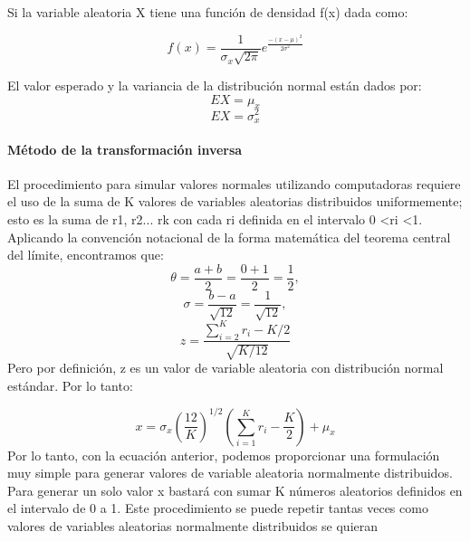 \documentclass{article}
\begin{document}
  Si la variable aleatoria X tiene una función de densidad f(x) dada como:

  \begin{equation}
    f(x) = \frac{1}{σ_{x}\sqrt {2\pi}}e^{\frac{-(x-\mu)^2}{2σ^2}}
  \end{equation}

  El valor esperado y la variancia de la distribución normal están dados por:
  \begin{equation}
    EX = \mu_{x}
  \end{equation}
  \begin{equation}
    EX = \sigma_{x}^2
  \end{equation}

  \paragraph{Método de la transformación inversa\newline}
  El procedimiento para simular valores normales utilizando computadoras requiere el uso de la suma de K valores de
  variables aleatorias distribuidos uniformemente; esto es la suma de r1, r2... rk con cada ri definida en el intervalo 0 <ri
  <1. Aplicando la convención notacional de la forma matemática del teorema central del límite, encontramos que:
  \begin{equation}
    \theta = \frac{a+b}{2} = \frac{0+1}{2} = \frac{1}{2},
  \end{equation}
  \begin{equation}
    \sigma = \frac{b-a}{\sqrt {12}} = \frac{1}{\sqrt {12}},
  \end{equation}
  \begin{equation}
    z = \frac{\sum_{i=2}^{K}r_{i}-K/2}{\sqrt {K/12}}
  \end{equation}
  Pero por definición, z es un valor de variable aleatoria con distribución normal estándar.
  Por lo tanto:

  \begin{equation}
    x = \sigma_{x}(\frac{12}{K})^{1/2}(\sum_{i=1}^{K}r_{i}-\frac{K}{2}) + \mu_{x}
  \end{equation}
  Por lo tanto, con la ecuación anterior, podemos proporcionar una formulación muy simple para generar valores de
  variable aleatoria normalmente distribuidos. Para generar un solo valor x bastará con sumar K números aleatorios
  definidos en el intervalo de 0 a 1. Este procedimiento se puede repetir tantas veces como valores de variables aleatorias
  normalmente distribuidos se quieran
\end{document}
